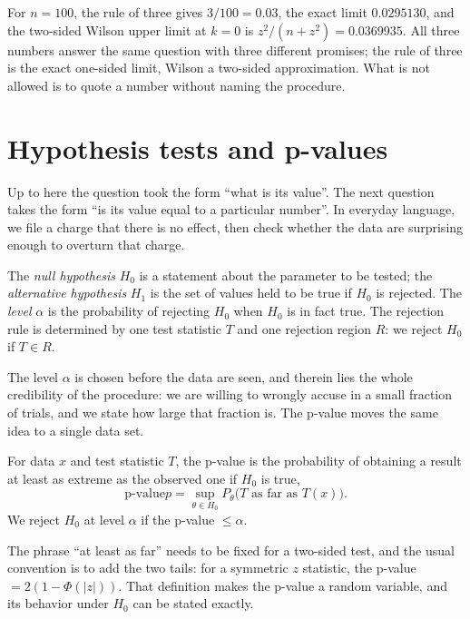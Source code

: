 For $n=100$, the rule of three gives $3/100=0.03$, the exact limit $0.0295130$, and the
two-sided Wilson upper limit at $k=0$ is $z^2/(n+z^2)=0.0369935$. All three numbers answer
the same question with three different promises; the rule of three is the exact one-sided
limit, Wilson a two-sided approximation. What is not allowed is to quote a number without
naming the procedure.

\section{Hypothesis tests and p-values}

Up to here the question took the form ``what is its value''. The next question takes the form
``is its value equal to a particular number''. In everyday language, we file a charge that
there is no effect, then check whether the data are surprising enough to overturn that charge.

\begin{definisi}
The \emph{null hypothesis} $H_0$ is a statement about the parameter to be tested; the
\emph{alternative hypothesis} $H_1$ is the set of values held to be true if $H_0$ is
rejected. The \emph{level} $\alpha$ is the probability of rejecting $H_0$ when $H_0$ is in fact
true. The rejection rule is determined by one test statistic $T$ and one rejection region
$R$: we reject $H_0$ if $T\in R$.
\end{definisi}

The level $\alpha$ is chosen before the data are seen, and therein lies the whole credibility
of the procedure: we are willing to wrongly accuse in a small fraction of trials, and we state
how large that fraction is. The p-value moves the same idea to a single data set.

\begin{definisi}[p-value]
For data $x$ and test statistic $T$, the p-value is the probability of obtaining a result at
least as extreme as the observed one if $H_0$ is true,
\[
\text{p-value} p=\sup_{\theta\in H_0}P_\theta\bigl(T\text{ as far as }T(x)\bigr).
\]
We reject $H_0$ at level $\alpha$ if the p-value $\le\alpha$.
\end{definisi}

The phrase ``at least as far'' needs to be fixed for a two-sided test, and the usual
convention is to add the two tails: for a symmetric $z$ statistic, the
p-value $=2(1-\Phi(|z|))$. That definition makes the p-value a random
variable, and its behavior under $H_0$ can be stated exactly.

